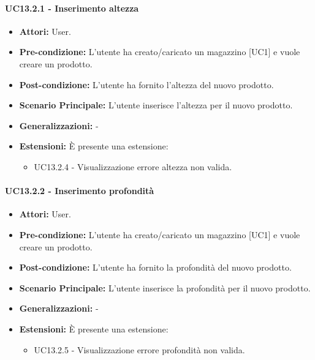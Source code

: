\paragraph{UC13.2.1 - Inserimento altezza}
\begin{itemize}
    \item \textbf{Attori:} User.
    \item \textbf{Pre-condizione:}  L'utente ha creato/caricato un magazzino [UC1] e vuole creare un prodotto.
    \item \textbf{Post-condizione:} L'utente ha fornito l'altezza del nuovo prodotto.
    \item \textbf{Scenario Principale:}  L'utente inserisce l'altezza per il nuovo prodotto.
    \item \textbf{Generalizzazioni:} -
    \item \textbf{Estensioni:} È presente una estensione:
    \begin{itemize}
        \item UC13.2.4 - Visualizzazione errore altezza non valida.
    \end{itemize}
\end{itemize}


\paragraph{UC13.2.2 - Inserimento profondità}
\begin{itemize}
    \item \textbf{Attori:} User.
    \item \textbf{Pre-condizione:}  L'utente ha creato/caricato un magazzino [UC1] e vuole creare un prodotto.
    \item \textbf{Post-condizione:} L'utente ha fornito la profondità del nuovo prodotto.
    \item \textbf{Scenario Principale:}  L'utente inserisce la profondità per il nuovo prodotto.
    \item \textbf{Generalizzazioni:} -
    \item \textbf{Estensioni:} È presente una estensione:
    \begin{itemize}
        \item UC13.2.5 - Visualizzazione errore profondità non valida.
    \end{itemize}
\end{itemize}


